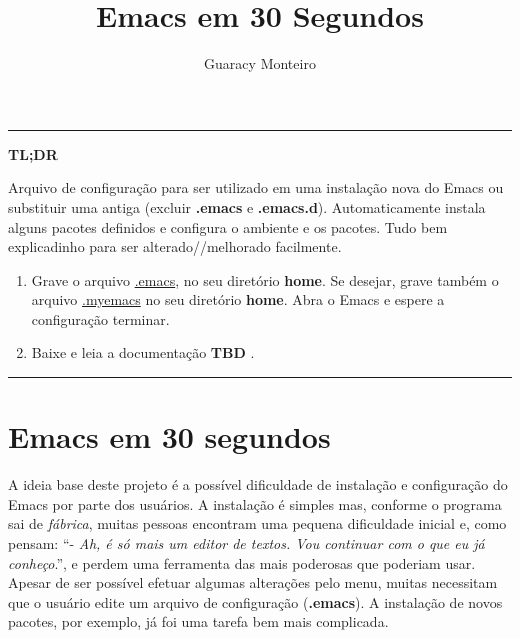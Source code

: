\documentclass[]{article}
\title{Emacs em 30 Segundos}
\author{Guaracy Monteiro}
\date{}
\providecommand{\tightlist}{%
  \setlength{\itemsep}{0pt}\setlength{\parskip}{0pt}}
\begin{document}
\maketitle

{
\setcounter{tocdepth}{3}
\tableofcontents
}
\pagebreak

\begin{center}\rule{0.5\linewidth}{\linethickness}\end{center}

\textbf{TL;DR}

Arquivo de configuração para ser utilizado em uma instalação nova do
Emacs ou substituir uma antiga (excluir \textbf{.emacs} e
\textbf{.emacs.d}). Automaticamente instala alguns pacotes definidos e
configura o ambiente e os pacotes. Tudo bem explicadinho para ser
alterado//melhorado facilmente.

\begin{enumerate}
\tightlist
\item
  Grave o arquivo
  \href{https://raw.githubusercontent.com/guaracy/emacs/master/config/.emacs}{.emacs},
  no seu diretório \textbf{home}. Se desejar, grave também o arquivo
  \href{https://raw.githubusercontent.com/guaracy/emacs/master/config/.myemacs}{.myemacs}
  no seu diretório \textbf{home}. Abra o Emacs e espere a configuração
  terminar.
\item
  Baixe e leia a documentação \textbf{TBD} .
\end{enumerate}

\begin{center}\rule{0.5\linewidth}{\linethickness}\end{center}

\pagebreak

\section{Emacs em 30 segundos}\label{emacs-em-30-segundos}

A ideia base deste projeto é a possível dificuldade de instalação e
configuração do Emacs por parte dos usuários. A instalação é simples
mas, conforme o programa sai de \emph{fábrica}, muitas pessoas encontram
uma pequena dificuldade inicial e, como pensam: ``- \emph{Ah, é só mais
um editor de textos. Vou continuar com o que eu já conheço}.'', e perdem
uma ferramenta das mais poderosas que poderiam usar. Apesar de ser
possível efetuar algumas alterações pelo menu, muitas necessitam que o
usuário edite um arquivo de configuração (\textbf{.emacs}). A instalação
de novos pacotes, por exemplo, já foi uma tarefa bem mais complicada.
\end{document}
